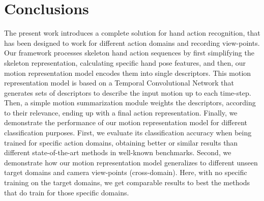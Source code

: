 \documentclass[letterpaper, 10 pt, conference]{ieeeconf}
\begin{document}
\section{Conclusions}

The present work introduces a complete solution for hand action recognition, that has been designed to work for different action domains and recording view-points.
Our framework processes skeleton hand action sequences by first simplifying the skeleton representation, calculating specific hand pose features, and then, our motion representation model encodes them into single descriptors.
This motion representation model is based on a Temporal Convolutional Network that generates sets of descriptors to describe the input motion up to each time-step. Then, a simple motion summarization module weights the descriptors, according to their relevance, ending up with a final action representation.
Finally, we demonstrate the performance of our motion representation model for different classification purposes.
First, we evaluate its classification accuracy when being trained for specific action domains, obtaining better or similar results than different state-of-the-art methods in well-known benchmarks.
Second, we demonstrate how our motion representation model generalizes to different unseen target domains and camera view-points (cross-domain). Here, with no specific training on the target domains, we get comparable results to best the methods that do train for those specific domains.



{


}
\end{document}
